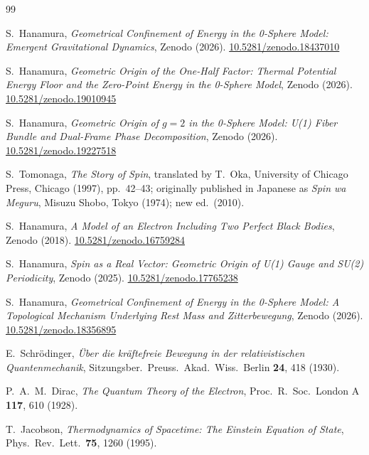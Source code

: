 \documentclass[%
 reprint, amsmath,amssymb, aps, prb, ]{revtex4-2}
\numberwithin{equation}{section}
\begin{document}
\begin{thebibliography}{99}

S.~Hanamura, \textit{Geometrical Confinement of Energy in the 0-Sphere Model: Emergent Gravitational Dynamics}, Zenodo (2026). \href{https://doi.org/10.5281/zenodo.18437010}{10.5281/zenodo.18437010}

S.~Hanamura, \textit{Geometric Origin of the One-Half Factor: Thermal Potential Energy Floor and the Zero-Point Energy in the 0-Sphere Model}, Zenodo (2026). \href{https://doi.org/10.5281/zenodo.19010945}{10.5281/zenodo.19010945}

S.~Hanamura, \textit{Geometric Origin of $g = 2$ in the 0-Sphere Model: U(1) Fiber Bundle and Dual-Frame Phase Decomposition}, Zenodo (2026). \href{https://doi.org/10.5281/zenodo.19227518}{10.5281/zenodo.19227518}

S.~Tomonaga, \textit{The Story of Spin}, translated by T.~Oka, University of Chicago Press, Chicago (1997), pp.~42--43; originally published in Japanese as \textit{Spin wa Meguru}, Misuzu Shobo, Tokyo (1974); new ed.\ (2010).

S.~Hanamura, \textit{A Model of an Electron Including Two Perfect Black Bodies}, Zenodo (2018). \href{https://doi.org/10.5281/zenodo.16759284}{10.5281/zenodo.16759284}

S.~Hanamura, \textit{Spin as a Real Vector: Geometric Origin of U(1) Gauge and SU(2) Periodicity}, Zenodo (2025). \href{https://doi.org/10.5281/zenodo.17765238}{10.5281/zenodo.17765238}

S.~Hanamura, \textit{Geometrical Confinement of Energy in the 0-Sphere Model: A Topological Mechanism Underlying Rest Mass and Zitterbewegung}, Zenodo (2026). \href{https://doi.org/10.5281/zenodo.18356895}{10.5281/zenodo.18356895}

E.~Schr\"{o}dinger, \textit{\"{U}ber die kr\"{a}ftefreie Bewegung in der relativistischen Quantenmechanik}, Sitzungsber.\ Preuss.\ Akad.\ Wiss.\ Berlin \textbf{24}, 418 (1930).

P.~A.~M.~Dirac, \textit{The Quantum Theory of the Electron}, Proc.\ R.\ Soc.\ London A \textbf{117}, 610 (1928).

T.~Jacobson, \textit{Thermodynamics of Spacetime: The Einstein Equation of State}, Phys.\ Rev.\ Lett.\ \textbf{75}, 1260 (1995).


\end{thebibliography}
\end{document}
